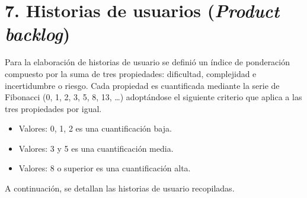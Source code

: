 \documentclass[
11pt, %
]{charter}
\begin{document}
\section{7. Historias de usuarios (\textit{Product backlog})}
\label{sec:backlog}

%
%
Para la elaboración de historias de usuario se definió un índice de ponderación compuesto por la suma de tres propiedades: dificultad, complejidad e incertidumbre o riesgo. Cada propiedad es cuantificada mediante la serie de Fibonacci (0, 1, 2, 3, 5, 8, 13, …) adoptándose el siguiente criterio que aplica a las tres propiedades por igual.
\begin{itemize}
\item Valores: 0, 1, 2 es una cuantificación baja.
\item Valores: 3 y 5 es una cuantificación media.
\item Valores: 8 o superior es una cuantificación alta.
\end{itemize}

A continuación, se detallan las historias de usuario recopiladas.
\end{document}
